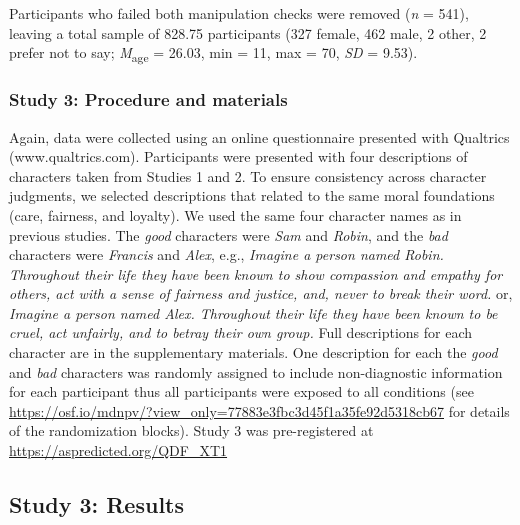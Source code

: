 \documentclass[
  man,floatsintext]{apa7}
\begin{document}
Participants who failed both manipulation checks were removed (\emph{n} = 541), leaving a total sample of 828.75 participants (327 female, 462 male, 2 other, 2 prefer not to say; \emph{M}\textsubscript{age} = 26.03, min = 11, max = 70, \emph{SD} = 9.53).

\hypertarget{study-3-procedure-and-materials}{%
\subsubsection{Study 3: Procedure and materials}\label{study-3-procedure-and-materials}}

Again, data were collected using an online questionnaire presented with Qualtrics (www.qualtrics.com). Participants were presented with four descriptions of characters taken from Studies 1 and 2. To ensure consistency across character judgments, we selected descriptions that related to the same moral foundations (care, fairness, and loyalty). We used the same four character names as in previous studies. The \emph{good} characters were \emph{Sam} and \emph{Robin}, and the \emph{bad} characters were \emph{Francis} and \emph{Alex}, e.g., \emph{Imagine a person named Robin. Throughout their life they have been known to show compassion and empathy for others, act with a sense of fairness and justice, and, never to break their word.} or, \emph{Imagine a person named Alex. Throughout their life they have been known to be cruel, act unfairly, and to betray their own group.} Full descriptions for each character are in the supplementary materials. One description for each the \emph{good} and \emph{bad} characters was randomly assigned to include non-diagnostic information for each participant thus all participants were exposed to all conditions (see \color{blue}\url{https://osf.io/mdnpv/?view_only=77883e3fbc3d45f1a35fe92d5318cb67}\color{black} for details of the randomization blocks). Study 3 was pre-registered at \color{blue}\url{https://aspredicted.org/QDF_XT1}\color{black}

\hypertarget{study-3-results}{%
\subsection{Study 3: Results}\label{study-3-results}}
\end{document}
